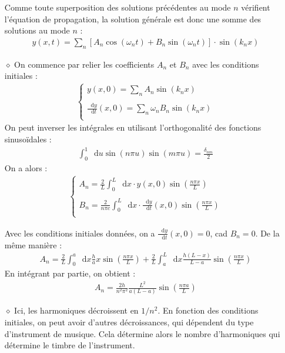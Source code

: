 \documentclass{report}
\newcommand*\dif{\mathop{}\!\mathrm{d}}
\begin{document}
\begin{itemize}
	Comme toute superposition des solutions précédentes au mode $n$ vérifient l'équation de propagation, la solution générale est donc une somme des solutions au mode $n$ :
	\begin{align*}
		y(x,t)=\sum_n \left[A_n\cos(\omega_nt) + B_n\sin(\omega_nt)\right] \cdot\sin(k_nx)
	\end{align*}
	\item[$\diamond$] On commence par relier les coefficients $A_n$ et $B_n$ avec les conditions initiales :
	\begin{align*}
	\left\lbrace
	\begin{array}{ccc}
	y(x,0)=\sum_n A_n\sin(k_nx)\\
	\\
	\frac{\dif y}{\dif t}(x,0)=\sum_n \omega_n B_n\sin(k_nx)\\
	\end{array}\right.
	\end{align*}		
	On peut inverser les intégrales en utilisant l'orthogonalité des fonctions sinusoïdales :
	\begin{align*}
	\int_0^1\dif u\sin(n\pi u)\sin(m\pi u)=\frac{\delta_{nm}}{2}
	\end{align*}			
On a alors :
	\begin{align*}
	\left\lbrace
	\begin{array}{ccc}
	A_n=\frac{2}{L}\int_0^L\dif x\cdot y(x,0)\sin\left(\frac{n\pi x}{L} \right) \\
	\\
	B_n=\frac{2}{n\pi c}\int_0^L\dif x\cdot \frac{\dif y}{\dif t}(x,0)\sin\left(\frac{n\pi x}{L} \right)\\
	\end{array}\right.
	\end{align*}		
	
	Avec les conditions initiales données, on a $\frac{\dif y}{\dif t}(x,0)=0$, cad $B_n=0$. De la même manière :
	\begin{align*}
		A_n=\frac{2}{L}\int_0^a\dif x \frac{h}{a}x\sin\left(\frac{n\pi x}{L} \right) + \frac{2}{L}\int_a^L\dif x \frac{h(L-x)}{L-a}\sin\left(\frac{n\pi x}{L} \right) 
	\end{align*}
	En intégrant par partie, on obtient :
	\begin{align*}
		A_n=\frac{2h}{n^2\pi^2}\frac{L^2}{a(L-a)}\sin\left(\frac{n\pi a}{L} \right) 
	\end{align*}
	\item[$\diamond$] Ici, les harmoniques décroissent en $1/n^2$. En fonction des conditions initiales, on peut avoir d'autres décroissances, qui dépendent du type d'instrument de musique. Cela détermine alors le nombre d'harmoniques qui détermine le timbre de l'instrument. 
	
\end{itemize}
\end{document}
